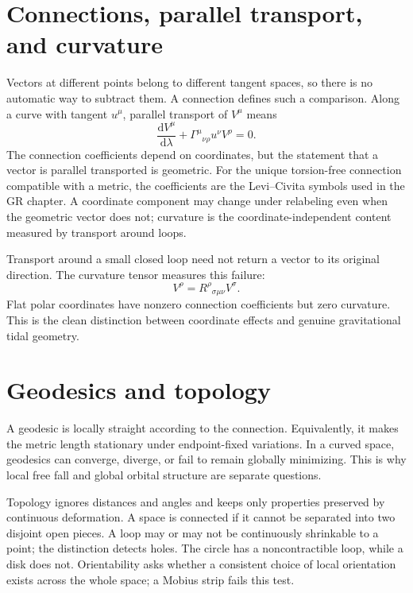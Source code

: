 \documentclass[11pt,oneside]{book}
\newcommand{\dd}{\mathrm{d}}
\theoremstyle{reviewstyle}
\begin{document}
\section{Connections, parallel transport, and curvature}
Vectors at different points belong to different tangent spaces, so there is no automatic way to subtract them. A connection defines such a comparison. Along a curve with tangent $u^\mu$, parallel transport of $V^\mu$ means
\begin{equation}
\frac{\dd V^\mu}{\dd\lambda}+\Gamma^\mu{}_{\nu\rho}u^\nu V^\rho=0.
\end{equation}
The connection coefficients depend on coordinates, but the statement that a vector is parallel transported is geometric. For the unique torsion-free connection compatible with a metric, the coefficients are the Levi--Civita symbols used in the GR chapter. A coordinate component may change under relabeling even when the geometric vector does not; curvature is the coordinate-independent content measured by transport around loops.

Transport around a small closed loop need not return a vector to its original direction. The curvature tensor measures this failure:
\begin{equation}
[\nabla_\mu,\nabla_\nu]V^\rho
=R^\rho{}_{\sigma\mu\nu}V^\sigma.
\end{equation}
Flat polar coordinates have nonzero connection coefficients but zero curvature. This is the clean distinction between coordinate effects and genuine gravitational tidal geometry.

\section{Geodesics and topology}
A geodesic is locally straight according to the connection. Equivalently, it makes the metric length stationary under endpoint-fixed variations. In a curved space, geodesics can converge, diverge, or fail to remain globally minimizing. This is why local free fall and global orbital structure are separate questions.

Topology ignores distances and angles and keeps only properties preserved by continuous deformation. A space is connected if it cannot be separated into two disjoint open pieces. A loop may or may not be continuously shrinkable to a point; the distinction detects holes. The circle has a noncontractible loop, while a disk does not. Orientability asks whether a consistent choice of local orientation exists across the whole space; a Mobius strip fails this test.
\end{document}
